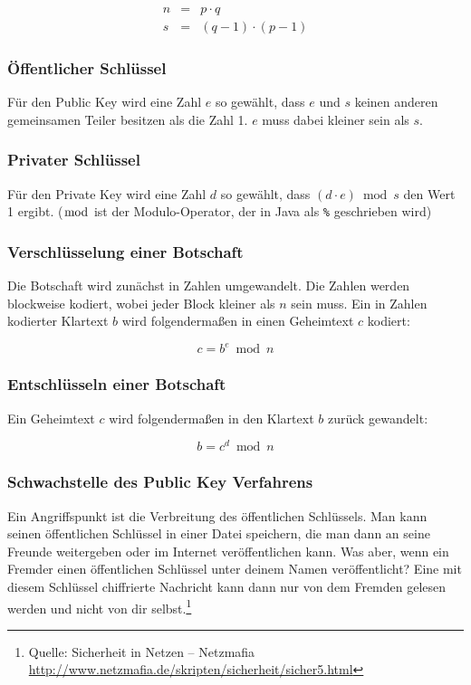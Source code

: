 \begin{eqnarray*}
n &=& p \cdot q\\
s &=& (q - 1) \cdot (p - 1)
\end{eqnarray*}

\subsubsection{Öffentlicher Schlüssel}

Für den  Public Key wird eine Zahl $e$ so gewählt, dass $e$ und $s$ keinen
anderen gemeinsamen Teiler besitzen als die Zahl 1. $e$ muss dabei kleiner
sein als $s$.

\subsubsection{Privater Schlüssel}

Für den Private Key wird eine Zahl $d$ so gewählt, dass $(d \cdot e) \bmod s$
den Wert 1 ergibt. ($\bmod$ ist der Modulo-Operator, der in Java als
\lstinline|%| geschrieben wird)

\subsubsection{Verschlüsselung einer Botschaft}

Die Botschaft wird zunächst in Zahlen umgewandelt. Die Zahlen werden blockweise
kodiert, wobei jeder Block kleiner als $n$ sein muss. Ein in Zahlen kodierter
Klartext $b$ wird folgendermaßen in einen Geheimtext $c$ kodiert:

\[
c = b^e \bmod n
\]

\subsubsection{Entschlüsseln einer Botschaft}

Ein Geheimtext $c$ wird folgendermaßen in den Klartext $b$ zurück gewandelt:

\[
b = c^d \bmod n
\] 

\subsubsection{Schwachstelle des Public Key Verfahrens}
	
Ein Angriffspunkt ist die Verbreitung des öffentlichen Schlüssels. Man kann
seinen öffentlichen Schlüssel in einer Datei speichern, die man dann an seine
Freunde weitergeben oder im Internet veröffentlichen kann. Was aber, wenn ein
Fremder einen öffentlichen Schlüssel unter deinem Namen veröffentlicht? Eine mit
diesem Schlüssel chiffrierte Nachricht kann dann nur von dem Fremden gelesen
werden und nicht von dir selbst.\footnote{Quelle: Sicherheit in Netzen --
Netzmafia \url{http://www.netzmafia.de/skripten/sicherheit/sicher5.html}}


